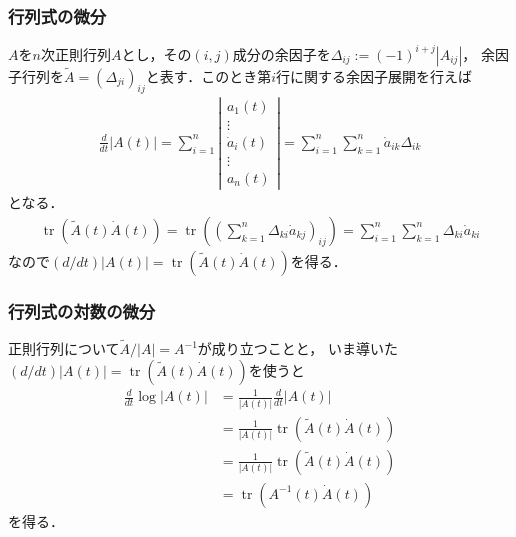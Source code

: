 \documentclass[10pt,hyperref={unicode}]{beamer}
\DeclareMathOperator*{\tr}{tr}
\newcommand{\absolute}[1]{\left|#1\right|}
\newcommand{\parentheses}[1]{\left(#1\right)}
\begin{document}
\begin{frame}
\frametitle{行列式の微分}
$A$を$n$次正則行列$A$とし，その$\parentheses{i,j}$成分の余因子を$\varDelta_{ij} := \parentheses{-1}^{i + j}\absolute{A_{ij}}$，
余因子行列を$\widetilde{A} = \parentheses{\varDelta_{ji}}_{ij}$と表す．このとき第$i$行に関する余因子展開を行えば
\begin{align*}
    \frac{d}{dt}\absolute{A\parentheses{t}}
    = \sum_{i = 1}^n \absolute{%
        \begin{array}{c}
            a_1\parentheses{t} \\
            \vdots \\
            \dot{a}_i\parentheses{t} \\
            \vdots \\
            a_n\parentheses{t}
        \end{array}
    }
    = \sum_{i = 1}^n \sum_{k = 1}^n \dot{a}_{ik} \varDelta_{ik}
\end{align*}
となる．
\begin{align*}
    \tr \parentheses{\widetilde{A}\parentheses{t}\dot{A}\parentheses{t}}
    = \tr \parentheses{\parentheses{\sum_{k = 1}^n \varDelta_{ki} \dot{a}_{kj}}_{ij}}
    = \sum_{i = 1}^n \sum_{k = 1}^n \varDelta_{ki} \dot{a}_{ki}
\end{align*}
なので$\parentheses{d/dt}\absolute{A\parentheses{t}} = \tr \parentheses{\widetilde{A}\parentheses{t}\dot{A}\parentheses{t}}$を得る．\nocite{golberg1972derivative}
\end{frame}

\begin{frame}
\frametitle{行列式の対数の微分}
正則行列について$\widetilde{A} / \absolute{A} = A^{-1}$が成り立つことと，
いま導いた$\parentheses{d/dt}\absolute{A\parentheses{t}} = \tr\parentheses{\widetilde{A}\parentheses{t}\dot{A}\parentheses{t}}$を使うと
\begin{align*}
    \frac{d}{dt}\log\absolute{A\parentheses{t}}
    &= \frac{1}{\absolute{A\parentheses{t}}}\frac{d}{dt}\absolute{A\parentheses{t}} \\
    &= \frac{1}{\absolute{A\parentheses{t}}}\tr\parentheses{\widetilde{A}\parentheses{t}\dot{A}\parentheses{t}} \\
    &=  \frac{1}{\absolute{A\parentheses{t}}}\tr\parentheses{\widetilde{A}\parentheses{t}\dot{A}\parentheses{t}} \\
    &=  \tr\parentheses{A^{-1}\parentheses{t}\dot{A}\parentheses{t}}
\end{align*}
を得る．
\end{frame}
\end{document}
